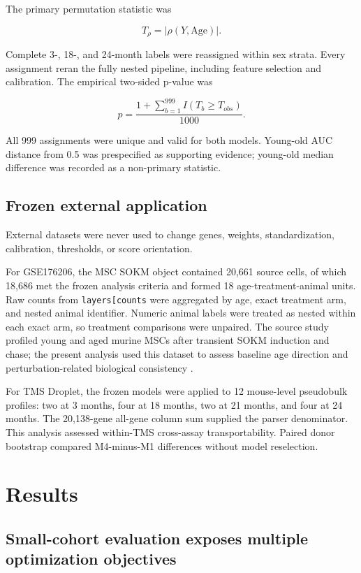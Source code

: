 \documentclass[10pt,twocolumn]{article}
\begin{document}
The primary permutation statistic was

\[
T_{\rho}=|\rho(Y,\mathrm{Age})|.
\]

Complete 3-, 18-, and 24-month labels were reassigned within sex strata. Every assignment reran the fully nested pipeline, including feature selection and calibration. The empirical two-sided p-value was

\[
p=\frac{1+\sum_{b=1}^{999}I(T_b\geq T_{obs})}{1000}.
\]

All 999 assignments were unique and valid for both models. Young-old AUC distance from 0.5 was prespecified as supporting evidence; young-old median difference was recorded as a non-primary statistic.

\subsection{Frozen external application}\label{frozen-external-application}

External datasets were never used to change genes, weights, standardization, calibration, thresholds, or score orientation.

For GSE176206, the MSC SOKM object contained 20,661 source cells, of which 18,686 met the frozen analysis criteria and formed 18 age-treatment-animal units. Raw counts from \texttt{layers{[}\textquotesingle{}counts\textquotesingle{}{]}} were aggregated by age, exact treatment arm, and nested animal identifier. Numeric animal labels were treated as nested within each exact arm, so treatment comparisons were unpaired. The source study profiled young and aged murine MSCs after transient SOKM induction and chase; the present analysis used this dataset to assess baseline age direction and perturbation-related biological consistency \citep{roux2022,geo176206}.

For TMS Droplet, the frozen models were applied to 12 mouse-level pseudobulk profiles: two at 3 months, four at 18 months, two at 21 months, and four at 24 months. The 20,138-gene all-gene column sum supplied the parser denominator. This analysis assessed within-TMS cross-assay transportability. Paired donor bootstrap compared M4-minus-M1 differences without model reselection.

\section{Results}\label{results}

\subsection{Small-cohort evaluation exposes multiple optimization objectives}\label{small-cohort-evaluation-exposes-multiple-optimization-objectives}
\end{document}
